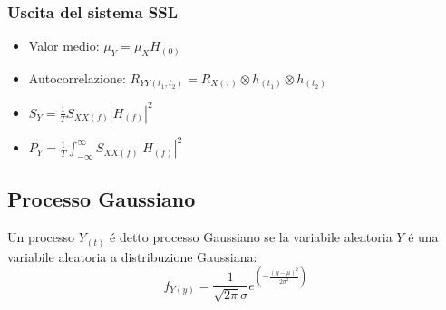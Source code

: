         \subsubsection{Uscita del sistema SSL}
            \begin{itemize}
                \item {Valor medio: $\mu_Y= \mu_X H_{(0)}$}
                \item {Autocorrelazione: $R_{YY(t_1,t_2)} = R_{X(\tau)} \otimes h_{(t_1)}\otimes h_{(t_2)}$
                }
                \item {$S_{Y} = \frac{1}{T} S_{XX(f)} |H_{(f)}|^2$}
                \item {$P_{Y} = \frac{1}{T} \int_{-\infty}^{\infty} S_{XX(f)} |H_{(f)}|^2$}
            \end{itemize}
    \subsection{Processo Gaussiano}
        Un processo $Y_{(t)}$ é detto processo Gaussiano se la variabile aleatoria $Y$ é una variabile aleatoria a distribuzione Gaussiana:
        \[
            f_{Y(y)} = \frac{1}{\sqrt{2\pi}\sigma}e^{\left(\displaystyle-\frac{(y-\mu)^2}{2\sigma^2}\right)}    
        \]
